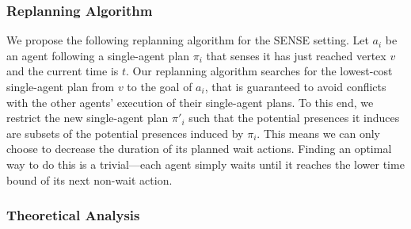 \documentclass[jair,twoside,11pt,theapa]{article}
\newcommand{\sense}{SENSE\xspace}
\begin{document}
\subsubsection{Replanning Algorithm}
We propose the following replanning algorithm for the \sense setting. 
Let $a_i$ be an agent following a single-agent plan $\pi_i$ that senses it has just reached vertex $v$ and the current time is $t$. 
Our replanning algorithm searches for the lowest-cost single-agent plan from $v$ to the goal of $a_i$, 
that is guaranteed to avoid conflicts with the other agents' execution of their single-agent plans. 
To this end, we restrict the new single-agent plan $\pi'_i$ such that the potential presences it induces 
are subsets of the potential presences induced by $\pi_i$. 
This means we can only choose to decrease the duration of its planned wait actions. 
Finding an optimal way to do this is a trivial---each agent simply waits until it reaches the lower time bound of its next non-wait action. 


\subsubsection{Theoretical Analysis}
%
%
%
\end{document}
